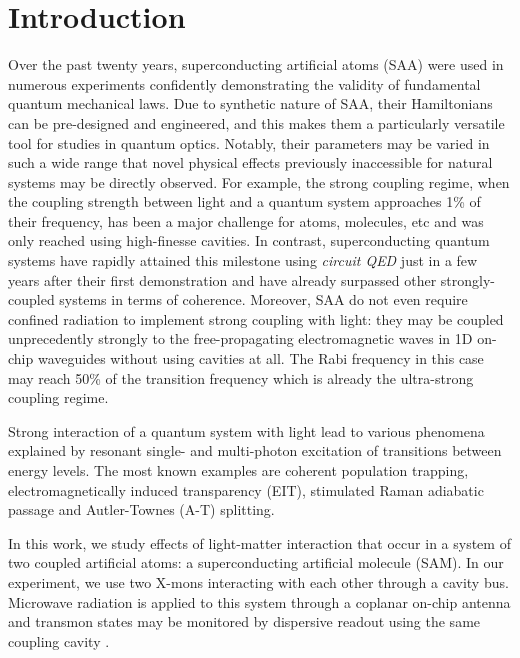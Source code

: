 \documentclass[%
 pra,
 amsmath,amssymb,
 reprint,%
]{revtex4-1}
\begin{document}
	\maketitle
\section{Introduction}


Over the past twenty years, superconducting artificial atoms (SAA) were used in numerous experiments confidently demonstrating the validity of fundamental quantum mechanical laws\cite{you2011atomic}. Due to synthetic nature of SAA, their Hamiltonians can be pre-designed and engineered, and this makes them a particularly versatile tool for studies in quantum optics. Notably, their parameters may be varied in such a wide range that novel physical effects previously inaccessible for natural systems may be directly observed. For example, the strong coupling regime, when the coupling strength between light and a quantum system approaches 1\% of their frequency, has been a major challenge for atoms, molecules, etc and was only reached using high-finesse cavities. In contrast, superconducting quantum systems have rapidly attained this milestone using \textit{circuit QED}\cite{wallraff2004strong} just in a few years after their first demonstration\cite{chiorescu2004coherent} and have already surpassed other strongly-coupled systems in terms of coherence\cite{forn2019ultrastrong}. 
Moreover, SAA do not even require confined radiation to implement strong coupling with light: they may be coupled unprecedently strongly to the free-propagating electromagnetic waves in 1D on-chip waveguides\cite{astafiev2010resonance} without using cavities at all. The Rabi frequency in this case may reach 50\% of the transition frequency\cite{deng2015observation} which is already the ultra-strong coupling regime\cite{forn2019ultrastrong}.

Strong interaction of a quantum system with light lead to various phenomena explained by resonant single- and multi-photon excitation of transitions between energy levels. The most known examples are coherent population trapping, electromagnetically induced transparency (EIT)\cite{boller1991observation}, stimulated Raman adiabatic passage\cite{bergmann1998coherent} and Autler-Townes (A-T) splitting\cite{autler1955stark}. 

In this work, we study effects of light-matter interaction that occur in a system of two coupled artificial atoms: a superconducting artificial molecule\cite{kou2017fluxonium} (SAM). In our experiment, we use two X-mons\cite{barends2013coherent} interacting with each other through a cavity bus\cite{majer2007coupling}. Microwave radiation is applied to this system through a coplanar on-chip antenna and transmon states may be monitored by dispersive readout using the same coupling cavity \cite{chow2010detecting}.
\end{document}
